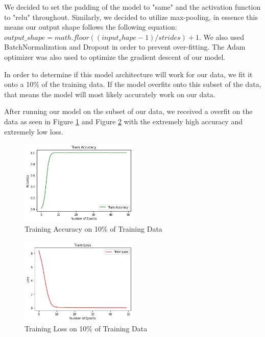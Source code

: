 \documentclass[paper=a4, fontsize=11pt]{scrartcl}
\numberwithin{equation}{section}		%
\numberwithin{table}{section}				%
\begin{document}
We decided to set the padding of the model to "same" and the activation function to "relu" throughout. Similarly, we decided to utilize max-pooling, in essence this means our output shape follows the following equation: $output\_shape = math.floor((input_shape - 1) / strides) + 1$. We also used BatchNormalization and Dropout in order to prevent over-fitting. The Adam optimizer was also used to optimize the gradient descent of our model.

In order to determine if this model architecture will work for our data, we fit it onto a 10\% of the training data. If the model overfits onto this subset of the data, that means the model will most likely accurately work on our data.

After running our model on the subset of our data, we received a overfit on the data as seen in Figure \ref{fig:cnn_acc_10p} and Figure \ref{fig:cnn_loss_10p} with the extremely high accuracy and extremely low loss.

\begin{figure}[h]
    \centering
    \includegraphics[width=0.5\textwidth]{reports/midterm_report/images/training_cnn_acc_10p.png}
    \caption{Training Accuracy on 10\% of Training Data}
    \label{fig:cnn_acc_10p}
\end{figure}

\begin{figure}[h]
    \centering
    \includegraphics[width=0.5\textwidth]{reports/midterm_report/images/training_10p_loss.png}
    \caption{Training Loss on 10\% of Training Data}
    \label{fig:cnn_loss_10p}
\end{figure}
\end{document}
